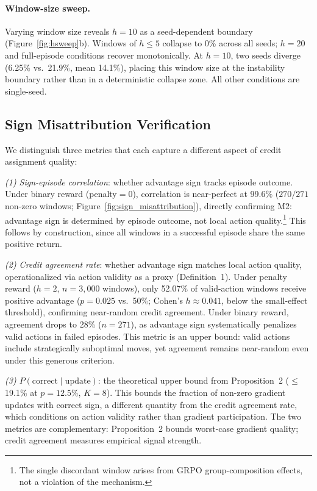 \paragraph{Window-size sweep.} Varying window size reveals $h{=}10$ as a seed-dependent boundary (Figure~\ref{fig:hsweep}b). Windows of $h{\leq}5$ collapse to 0\% across all seeds; $h{=}20$ and full-episode conditions recover monotonically. At $h{=}10$, two seeds diverge (6.25\% vs.\ 21.9\%, mean 14.1\%), placing this window size at the instability boundary rather than in a deterministic collapse zone. All other conditions are single-seed.
\label{sec:results_hsweep}

\subsection{Sign Misattribution Verification}
\label{sec:sign_verification}

We distinguish three metrics that each capture a different aspect of credit assignment quality:

\textit{(1) Sign-episode correlation}: whether advantage sign tracks episode outcome. Under binary reward (penalty${=}0$), correlation is near-perfect at 99.6\% ($270/271$ non-zero windows; Figure~\ref{fig:sign_misattribution}), directly confirming M2: advantage sign is determined by episode outcome, not local action quality.\footnote{The single discordant window arises from GRPO group-composition effects, not a violation of the mechanism.} This follows by construction, since all windows in a successful episode share the same positive return.

\textit{(2) Credit agreement rate}: whether advantage sign matches local action quality, operationalized via action validity as a proxy (Definition~1). Under penalty reward ($h{=}2$, $n{=}3{,}000$ windows), only 52.07\% of valid-action windows receive positive advantage ($p{=}0.025$ vs.\ 50\%; Cohen's $h \approx 0.041$, below the small-effect threshold), confirming near-random credit agreement. Under binary reward, agreement drops to 28\% ($n{=}271$), as advantage sign systematically penalizes valid actions in failed episodes. This metric is an upper bound: valid actions include strategically suboptimal moves, yet agreement remains near-random even under this generous criterion.

\textit{(3) $P(\text{correct} \mid \text{update})$}: the theoretical upper bound from Proposition~2 ($\leq$19.1\% at $p{=}12.5\%$, $K{=}8$). This bounds the fraction of non-zero gradient updates with correct sign, a different quantity from the credit agreement rate, which conditions on action validity rather than gradient participation. The two metrics are complementary: Proposition~2 bounds worst-case gradient quality; credit agreement measures empirical signal strength.

